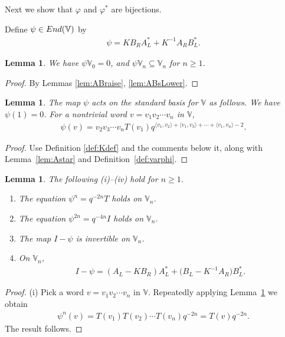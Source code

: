 \documentclass[11pt]{article}
\numberwithin{equation}{section}
\numberwithin{equation}{section}
\newtheorem{Lemma}[Theorem]{Lemma}
\begin{document}
{Next we show that $\varphi$ and $\varphi^*$ are bijections.

\begin{Definition}\label{def:varphi} Define $\psi \in {\rm End}(\mathbb V)$ by
\begin{gather}\label{eq:varphi}
\psi = K B_R A^*_L + K^{-1} A_R B^*_L.
\end{gather}
\end{Definition}

\begin{Lemma}We have $\psi \mathbb V_0=0$, and $\psi \mathbb V_n \subseteq \mathbb V_n$ for $n \geq 1$.
\end{Lemma}
\begin{proof} By Lemmas \ref{lem:ABraise}, \ref{lem:ABsLower}.
\end{proof}

\begin{Lemma}\label{lem:varphiAct} The map $\psi $ acts on the standard basis for $\mathbb V$ as follows. We have $\psi(1)=0$. For a nontrivial word $v=v_1 v_2 \cdots v_n$ in $\mathbb V$,
\begin{gather*}
\psi(v) = v_2 v_3 \cdots v_n T(v_1)q^{\langle v_1, v_2\rangle+\langle v_1, v_3\rangle+\cdots + \langle v_1, v_n\rangle-2}.
\end{gather*}
\end{Lemma}
\begin{proof} Use Definition \ref{def:Kdef} and the comments below it, along with Lemma~\ref{lem:Astar} and Definition~\ref{def:varphi}.
\end{proof}

\begin{Lemma}\label{lem:spam} The following {\rm (i)--(iv)} hold for $n\geq 1$.
\begin{enumerate}\itemsep=0pt
\item[\rm (i)]
The equation
$\psi^n = q^{-2n} T$ holds
on $\mathbb V_n$.
\item[\rm (ii)] The equation
$\psi^{2n} = q^{-4n} I$ holds
on $\mathbb V_n$.
\item[\rm (iii)]
The map $I-\psi$ is invertible on $\mathbb V_n$.
\item[\rm (iv)] On $\mathbb V_n$,
\begin{gather*}
I-\psi= (A_L-K B_R)A^*_L +\big(B_L-K^{-1} A_R\big)B^*_L.
\end{gather*}
\end{enumerate}
\end{Lemma}
\begin{proof} (i) Pick a word $v=v_1v_2 \cdots v_n$ in $\mathbb V$. Repeatedly applying Lemma~\ref{lem:varphiAct} we obtain
\begin{gather*}
\psi^n(v) = T(v_1) T(v_2) \cdots T(v_n) q^{-2n} = T(v) q^{-2n}.
\end{gather*}
The result follows.


\end{proof}}
\end{document}
